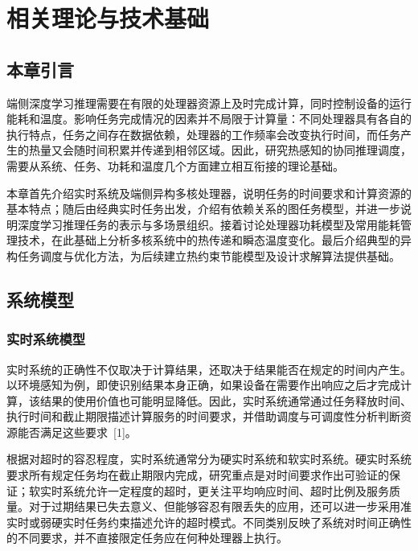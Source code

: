 \chapter{相关理论与技术基础}
\label{ch:foundation}

\section{本章引言}

端侧深度学习推理需要在有限的处理器资源上及时完成计算，同时控制设备的运行能耗和温度。影响任务完成情况的因素并不局限于计算量：不同处理器具有各自的执行特点，任务之间存在数据依赖，处理器的工作频率会改变执行时间，而任务产生的热量又会随时间积累并传递到相邻区域。因此，研究热感知的协同推理调度，需要从系统、任务、功耗和温度几个方面建立相互衔接的理论基础。

本章首先介绍实时系统及端侧异构多核处理器，说明任务的时间要求和计算资源的基本特点；随后由经典实时任务出发，介绍有依赖关系的图任务模型，并进一步说明深度学习推理任务的表示与多场景组织。接着讨论处理器功耗模型及常用能耗管理技术，在此基础上分析多核系统中的热传递和瞬态温度变化。最后介绍典型的异构任务调度与优化方法，为后续建立热约束节能模型及设计求解算法提供基础。

\section{系统模型}

\subsection{实时系统模型}

实时系统的正确性不仅取决于计算结果，还取决于结果能否在规定的时间内产生。以环境感知为例，即使识别结果本身正确，如果设备在需要作出响应之后才完成计算，该结果的使用价值也可能明显降低。因此，实时系统通常通过任务释放时间、执行时间和截止期限描述计算服务的时间要求，并借助调度与可调度性分析判断资源能否满足这些要求~[1]。

根据对超时的容忍程度，实时系统通常分为硬实时系统和软实时系统。硬实时系统要求所有规定任务均在截止期限内完成，研究重点是对时间要求作出可验证的保证；软实时系统允许一定程度的超时，更关注平均响应时间、超时比例及服务质量。对于过期结果已失去意义、但能够容忍有限丢失的应用，还可以进一步采用准实时或弱硬实时任务约束描述允许的超时模式。不同类别反映了系统对时间正确性的不同要求，并不直接限定任务应在何种处理器上执行。

